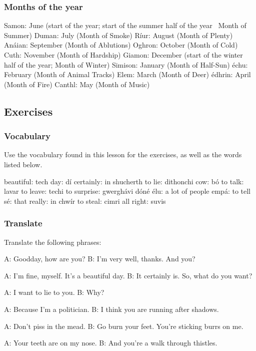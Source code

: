 \subsubsection{Months of the year}

Samon: June (start of the year; start of the summer half of the year \textendash\ Month of Summer)
Duman: July (Month of Smoke)
R\'{i}ur: August (Month of Plenty)
An\'{a}ian: September (Month of Ablutions)
Oghron: October (Month of Cold)
Cuth: November (Month of Hardship)
Giamon: December (start of the winter half of the year; Month of Winter)
Simison: January (Month of Half-Sun)
\'{e}chu: February (Month of Animal Tracks)
Elem: March (Month of Deer)
\'{e}dhrin: April (Month of Fire)
Canthl: May (Month of Music)

\newpage
\subsection{Exercises}

\subsubsection{Vocabulary}

Use the vocabulary found in this lesson for the exercises, as well as the words listed below.

beautiful: tech
day: d\'{i}
certainly: in shucherth
to lie: dithonchi
cow: b\'{o}
to talk: lavar
to leave: techi
to surprise: gwergh\'{a}vi
d\'{o}n\'{e} \'{e}lu: a lot of people
emp\'{a}: to tell
s\'{e}: that
really: in chw\'{i}r
to steal: cimri
all right: suvis

\subsubsection{Translate}

Translate the following phrases:

A: Goodday, how are you?
B: I'm very well, thanks. And you?

A: I'm fine, myself. It's a beautiful day.
B: It certainly is. So, what do you want?

A: I want to lie to you.
B: Why?

A: Because I'm a politician.
B: I think you are running after shadows.

A: Don't piss in the mead.
B: Go burn your feet. You're sticking burrs on me.

A: Your teeth are on my nose.
B: And you're a walk through thistles.

